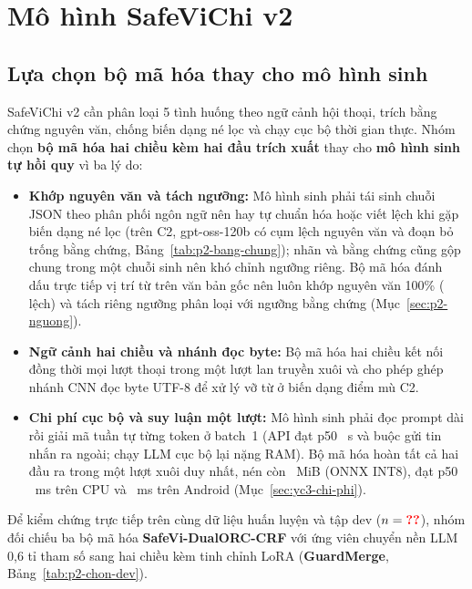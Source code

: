 
\section{Mô hình SafeViChi v2}
\label{sec:p2-mo-hinh}

\subsection{Lựa chọn bộ mã hóa thay cho mô hình sinh}

SafeViChi v2 cần phân loại 5 tình huống theo ngữ cảnh hội thoại, trích bằng chứng nguyên văn, chống biến dạng né lọc và
chạy cục bộ thời gian thực. Nhóm chọn \textbf{bộ mã hóa hai chiều kèm hai đầu trích xuất} thay cho \textbf{mô hình sinh
tự hồi quy} vì ba lý do:

\begin{itemize}
  \item \textbf{Khớp nguyên văn và tách ngưỡng:} Mô hình sinh phải tái sinh chuỗi JSON theo phân phối ngôn ngữ nên hay
        tự chuẩn hóa hoặc viết lệch khi gặp biến dạng né lọc (trên C2, gpt-oss-120b có  cụm
        lệch nguyên văn và  đoạn bỏ trống bằng chứng, Bảng~\ref{tab:p2-bang-chung}); nhãn và bằng chứng
        cũng gộp chung trong một chuỗi sinh nên khó chỉnh ngưỡng riêng. Bộ mã hóa đánh dấu trực tiếp vị trí từ trên văn
        bản gốc nên luôn khớp nguyên văn 100\% ( lệch) và tách riêng ngưỡng phân loại với
        ngưỡng bằng chứng (Mục~\ref{sec:p2-nguong}).
  \item \textbf{Ngữ cảnh hai chiều và nhánh đọc byte:} Bộ mã hóa hai chiều kết nối đồng thời mọi lượt thoại trong một
        lượt lan truyền xuôi và cho phép ghép nhánh CNN đọc byte UTF-8 để xử lý vỡ từ ở biến dạng điểm mù C2.
  \item \textbf{Chi phí cục bộ và suy luận một lượt:} Mô hình sinh phải đọc prompt dài rồi giải mã tuần tự từng token ở
        batch~1 (API đạt p50 ~s và buộc gửi tin nhắn ra ngoài; chạy LLM cục bộ lại nặng RAM). Bộ mã hóa
        hoàn tất cả hai đầu ra trong một lượt xuôi duy nhất, nén còn ~MiB (ONNX INT8), đạt p50
        ~ms trên CPU và ~ms trên Android (Mục~\ref{sec:yc3-chi-phi}).
\end{itemize}

Để kiểm chứng trực tiếp trên cùng dữ liệu huấn luyện và tập dev ($n = \so{dev.chia.dev}$), nhóm đối chiếu ba bộ mã hóa
\textbf{SafeVi-DualORC-CRF} với ứng viên chuyển nền LLM 0,6 tỉ tham số sang hai chiều kèm tinh chỉnh LoRA
(\textbf{GuardMerge}, Bảng~\ref{tab:p2-chon-dev}).

